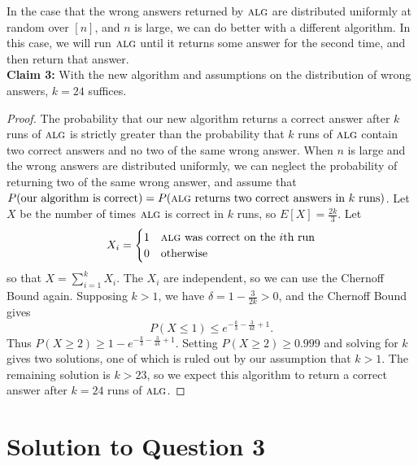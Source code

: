 \documentclass[11pt]{article}
\newcommand{\alg}{\textsc{alg}}
\begin{document}
In the case that the wrong answers returned by $\alg$ are distributed uniformly at random over $[n]$, and $n$ is large, we can do better with a different algorithm.
In this case, we will run $\alg$ until it returns some answer for the second time, and then return that answer.\\

\noindent \textbf{Claim 3:} With the new algorithm and assumptions on the distribution of wrong answers, $k = 24$ suffices.

\begin{proof}
  The probability that our new algorithm returns a correct answer after $k$ runs of $\alg$ is strictly greater than the probability that $k$ runs of $\alg$ contain two correct answers and no two of the same wrong answer.
  When $n$ is large and the wrong answers are distributed uniformly, we can neglect the probability of returning two of the same wrong answer, and assume that $P(\textnormal{our algorithm is correct}) = P(\textnormal{$\alg$ returns two correct answers in $k$ runs})$.
  Let $X$ be the number of times $\alg$ is correct in $k$ runs, so $E[X] = \frac{2k}{3}.$
  Let \[X_i = \begin{cases}1 & \alg \textnormal{ was correct on the $i$th run}\\ 0 & \textnormal{otherwise}\end{cases}\] so that $X = \sum_{i = 1}^{k} X_i$.
  The $X_i$ are independent, so we can use the Chernoff Bound again.
  Supposing $k > 1$, we have $\delta = 1 - \frac{3}{2k} > 0$, and the Chernoff Bound gives \[P(X \leq 1) \leq e^{-\frac{k}{3} - \frac{3}{4k} + 1}.\]
  Thus $P(X \geq 2) \geq 1 - e^{-\frac{k}{3} - \frac{3}{4k} + 1}$.
  Setting $P(X \geq 2) \geq 0.999$ and solving for $k$ gives two solutions, one of which is ruled out by our assumption that $k > 1$.
  The remaining solution is $k > 23$, so we expect this algorithm to return a correct answer after $k = 24$ runs of $\alg$.
\end{proof}
\newpage

\section{Solution to Question 3}
\end{document}

